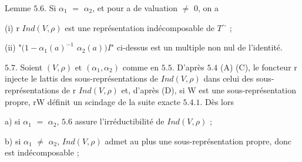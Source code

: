 \documentclass[10pt,a4paper]{article}
\begin{document}
\par Lemme $5.6$. Si $\alpha{}_1$ $=$ $\alpha{}_2$, et pour a de valuation $\ne{}$ 0, on a\par
\par (i) r $Ind(V,\rho{})$ est une représentation indécomposable de $T^\sim$ ;\par
\par (ii) "$(1-\alpha{}_1(a)^{-1}$ $\alpha{}_2(a))I$" ci-dessus est un multiple non nul de l'identité.\par
\par $5.7$. Soient $(V,\rho{})$ et $(\alpha{}_1,\alpha{}_2)$ comme en $5.5$. D'après $5.4$ (A) (C), le foncteur r injecte le lattis des sous-représentations de $Ind(V,\rho{})$ dans celui des sous-représentations de r $Ind(V,\rho{})$ et, d'après (D), si W est une sous-représentation propre, rW définit un scindage de la suite exacte $5.4.1$. Dès lors\par
\par a) si $\alpha{}_1$ $=$ $\alpha{}_2$, $5.6$ assure l'irréductibilité de $Ind(V,\rho{})$ ;\par
\par b) si $\alpha{}_1$ $\ne{}$ $\alpha{}_2$, $Ind(V,\rho{})$ admet au plus une sous-représentation propre, donc est indécomposable ;\par
\end{document}

